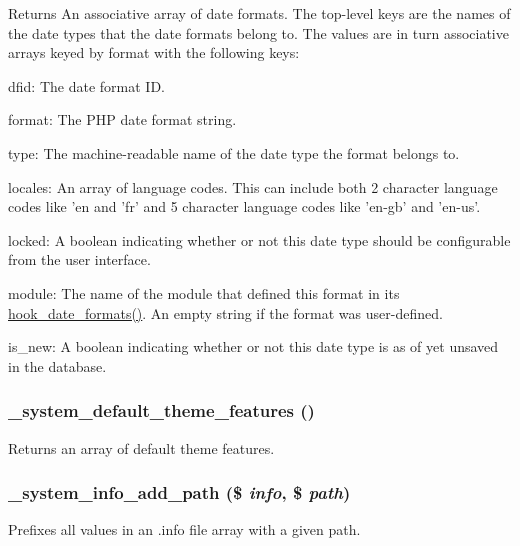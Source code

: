 \begin{DoxyReturn}{Returns}
An associative array of date formats. The top-\/level keys are the names of the date types that the date formats belong to. The values are in turn associative arrays keyed by format with the following keys:
\begin{DoxyItemize}
\item dfid: The date format ID.
\item format: The PHP date format string.
\item type: The machine-\/readable name of the date type the format belongs to.
\item locales: An array of language codes. This can include both 2 character language codes like 'en and 'fr' and 5 character language codes like 'en-\/gb' and 'en-\/us'.
\item locked: A boolean indicating whether or not this date type should be configurable from the user interface.
\item module: The name of the module that defined this format in its \hyperlink{group__hooks_ga2a190ba304193ab7752bfc489463a0d7}{hook\_\-date\_\-formats()}. An empty string if the format was user-\/defined.
\item is\_\-new: A boolean indicating whether or not this date type is as of yet unsaved in the database. 
\end{DoxyItemize}
\end{DoxyReturn}
\hypertarget{system_8module_a60145d0b4f9bc1069e6349aae007a1b6}{
\subsubsection[{\_\-system\_\-default\_\-theme\_\-features}]{\setlength{\rightskip}{0pt plus 5cm}\_\-system\_\-default\_\-theme\_\-features ()}}
\label{system_8module_a60145d0b4f9bc1069e6349aae007a1b6}
Returns an array of default theme features. \hypertarget{system_8module_af55f5f5ba28e42c6fb21471e13f68017}{
\subsubsection[{\_\-system\_\-info\_\-add\_\-path}]{\setlength{\rightskip}{0pt plus 5cm}\_\-system\_\-info\_\-add\_\-path (\$ {\em info}, \/  \$ {\em path})}}
\label{system_8module_af55f5f5ba28e42c6fb21471e13f68017}
Prefixes all values in an .info file array with a given path.

